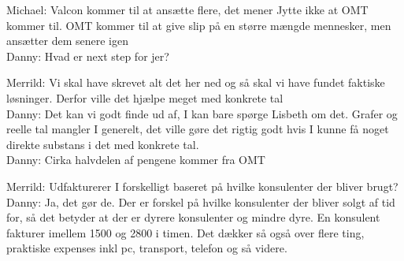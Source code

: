 \begin{linenumbers*}
Michael: Valcon kommer til at ansætte flere, det mener Jytte ikke at OMT kommer til. OMT kommer til at give slip på en større mængde mennesker, men ansætter dem senere igen\\
Danny: Hvad er next step for jer?

Merrild: Vi skal have skrevet alt det her ned og så skal vi have fundet faktiske løsninger. Derfor ville det hjælpe meget med konkrete tal\\
Danny: Det kan vi godt finde ud af, I kan bare spørge Lisbeth om det. Grafer og reelle tal mangler I generelt, det ville gøre det rigtig godt hvis I kunne få noget direkte substans i det med konkrete tal.\\
Danny: Cirka halvdelen af pengene kommer fra OMT

Merrild: Udfakturerer I forskelligt baseret på hvilke konsulenter der bliver brugt?\\
Danny: Ja, det gør de. Der er forskel på hvilke konsulenter der bliver solgt af tid for, så det betyder at der er dyrere konsulenter og mindre dyre. En konsulent fakturer imellem 1500 og 2800 i timen. Det dækker så også over flere ting, praktiske expenses inkl pc, transport, telefon og så videre.
\end{linenumbers*}